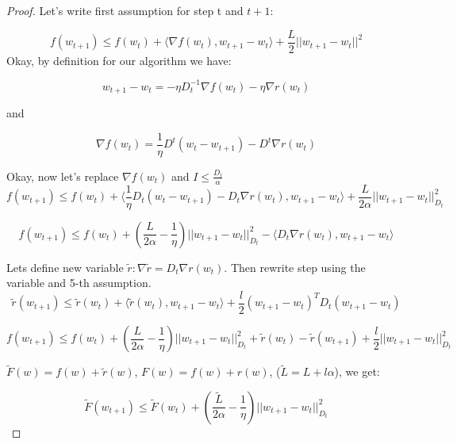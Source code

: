 \documentclass{article}
\begin{document}
\begin{proof}

Let's write first assumption for step t and $t+1$:

\begin{equation*}
    f(w_{t+1}) \leq f(w_t) + \langle \nabla f(w_t), w_{t+1} - w_t \rangle + \frac{L}{2}||w_{t+1} - w_t ||^2
\end{equation*}
Okay, by definition for our algorithm we have:

\begin{equation*}
w_{t+1} - w_t = -\eta D_t^{-1} \nabla f(w_t) - \eta \nabla r(w_t)    
\end{equation*}

and 

\begin{equation*}
\nabla f(w_t) = \frac{1}{\eta} D^t(w_t - w_{t+1}) - D^t \nabla r(w_t)
\end{equation*}

Okay, now let's replace $\nabla f(w_t)$ and $I \leq \frac{D_t}{\alpha}$
\begin{equation*}
    f(w_{t+1}) \leq f(w_t) + \langle \frac{1}{\eta}D_t(w_t - w_{t+1}) - D_t\nabla r(w_t), w_{t+1} - w_t \rangle + \frac{L}{2 \alpha} ||w_{t+1} - w_t||_{D_t}^2
\end{equation*}

\begin{equation*}
    f(w_{t+1}) \leq f(w_t) + \left(\frac{L}{2 \alpha} - \frac{1}{\eta} \right) ||w_{t+1} - w_t||_{D_t}^2 - \langle D_t \nabla r(w_t), w_{t+1} - w_t \rangle
\end{equation*}

Lets define new variable $\tilde{r} : \nabla \tilde{r} = D_t \nabla r(w_t)$. Then rewrite step using the variable and 5-th assumption.
\begin{equation*}
    \tilde{r}(w_{t+1}) \leq \tilde{r}(w_t) + \langle \tilde{r}(w_t), w_{t+1} - w_t \rangle + \frac{l}{2} (w_{t+1} - w_t)^T D_t (w_{t+1} - w_t)
\end{equation*}

\begin{equation*}
    f(w_{t+1}) \leq f(w_t) + \left( \frac{L}{2\alpha} - \frac{1}{\eta} \right) ||w_{t+1} - w_t||_{D_t}^2 + \tilde{r}(w_t) - \tilde{r}(w_{t+1}) + \frac{l}{2}||w_{t+1}-w_t||_{D_t}^2
\end{equation*}

$\tilde{F}(w) = f(w) + \tilde{r}(w)$, $F(w) = f(w) + r(w)$, ($\tilde{L}=L + l \alpha$), we get:

\begin{equation*}
    \tilde{F}(w_{t+1}) \leq \tilde{F}(w_t) + \left( \frac{\tilde{L}}{2\alpha} - \frac{1}{\eta}  \right) ||w_{t+1} - w_t||_{D_t}^2
\end{equation*}



\end{proof}
\end{document}
